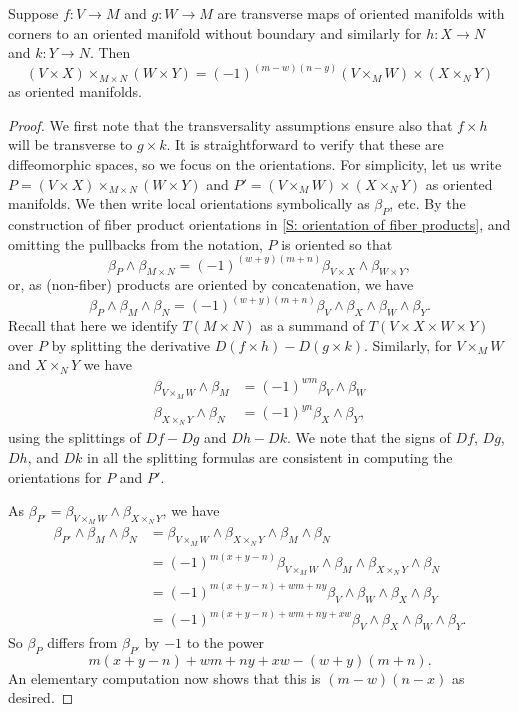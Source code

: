 \begin{proposition}\label{P: oriented interchange}
	Suppose $f \colon V \to M$ and $g \colon W \to M$ are transverse maps of oriented manifolds with corners to an oriented manifold without boundary and similarly for $h \colon X \to N$ and $k \colon Y \to N$.
	Then
	$$(V \times X)\times_{M \times N} (W \times Y) = (-1)^{(m-w)(n-y)}(V \times_M W) \times (X \times_N Y)$$
	as oriented manifolds.
\end{proposition}

\begin{proof}
	We first note that the transversality assumptions ensure also that $f \times h$ will be transverse to $g \times k$.
	It is straightforward to verify that these are diffeomorphic spaces, so we focus on the orientations.
	For simplicity, let us write
	$P = (V \times X)\times_{M \times N} (W \times Y)$ and $P' = (V \times_M W) \times (X \times_N Y)$ as oriented manifolds.
	We then write local orientations symbolically as $\beta_P$, etc.
	By the construction of fiber product orientations in \cref{S: orientation of fiber products}, and omitting the pullbacks from the notation, $P$ is oriented so that
	$$\beta_P \wedge \beta_{M \times N} = (-1)^{(w+y)(m+n)}\beta_{V \times X} \wedge \beta_{W \times Y},$$
	or, as (non-fiber) products are oriented by concatenation, we have
	$$\beta_P \wedge \beta_M\wedge\beta_N = (-1)^{(w+y)(m+n)}\beta_V \wedge \beta_X \wedge \beta_W \wedge \beta_Y.$$
	Recall that here we identify $T(M \times N)$ as a summand of $T(V \times X \times W \times Y)$ over $P$ by splitting the derivative $D(f \times h) - D(g \times k)$.
	Similarly, for $V \times_M W$ and $X \times_N Y$ we have
	\begin{align*}
		\beta_{V \times_M W} \wedge \beta_M & = (-1)^{wm}\beta_V \wedge \beta_W \\
		\beta_{X \times_N Y} \wedge \beta_N & = (-1)^{yn}\beta_X \wedge \beta_Y,
	\end{align*}
	using the splittings of $Df-Dg$ and $Dh-Dk$.
	We note that the signs of $Df$, $Dg$, $Dh$, and $Dk$ in all the splitting formulas are consistent in computing the orientations for $P$ and $P'$.

	As $\beta_{P'} = \beta_{V \times_M W} \wedge \beta_{X \times_N Y}$, we have
	\begin{align*}
		\beta_{P'} \wedge \beta_M \wedge \beta_N
		&= \beta_{V \times_M W} \wedge \beta_{X \times_N Y} \wedge \beta_M \wedge \beta_N\\
		& = (-1)^{m(x+y-n)}\beta_{V \times_M W} \wedge \beta_M \wedge \beta_{X \times_N Y} \wedge \beta_N\\
		& = (-1)^{m(x+y-n)+wm+ny}\beta_V \wedge \beta_W \wedge \beta_X \wedge \beta_Y \\
		& = (-1)^{m(x+y-n)+wm+ny+xw}\beta_V \wedge \beta_X \wedge \beta_W \wedge \beta_Y.
	\end{align*}
	So $\beta_P$ differs from $\beta_{P'}$ by $-1$ to the power
	$$m(x+y-n) + wm + ny + xw - (w+y)(m+n).$$
	An elementary computation now shows that this is $(m-w)(n-x)$ as desired.
\end{proof}

